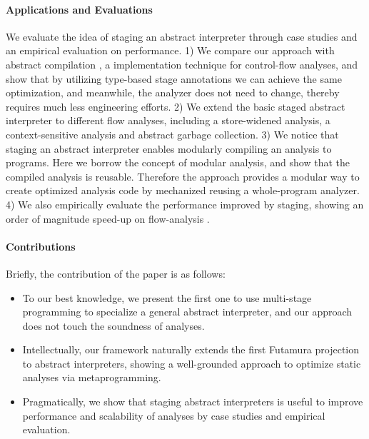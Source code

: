 \paragraph{Applications and Evaluations}
We evaluate the idea of staging an abstract interpreter through
case studies and an empirical evaluation on performance.
1) We compare our approach with abstract compilation
\cite{Boucher:1996:ACN:647473.727587}, a implementation technique for
control-flow analyses, and show that by utilizing type-based stage
annotations we can achieve the same optimization, and meanwhile,
the analyzer does not need to change, thereby requires much less
engineering efforts.
2) We extend the basic staged abstract interpreter to different flow
analyses, including a store-widened analysis, a context-sensitive
analysis and abstract garbage collection.
3) We notice that staging an abstract interpreter enables modularly
compiling an analysis to programs. Here we borrow the concept of modular
analysis, and show that the compiled analysis is reusable.
Therefore the approach provides a modular way to create optimized analysis
code by mechanized reusing a whole-program analyzer.
4) We also empirically evaluate the performance improved by staging,
showing an order of magnitude speed-up on flow-analysis .

\paragraph{Contributions} Briefly, the contribution of the paper is as follows:
\begin{itemize}[leftmargin=2em]
  \item To our best knowledge, we present the first one to use
    multi-stage programming to specialize a general abstract interpreter,
    and our approach does not touch the soundness of analyses.
  \item Intellectually, our framework naturally extends the first
    Futamura projection to abstract interpreters, showing a
    well-grounded approach to optimize static analyses via
    metaprogramming.
  \item Pragmatically, we show that staging abstract interpreters is
    useful to improve performance and scalability of analyses by case
    studies and empirical evaluation.
\end{itemize}

